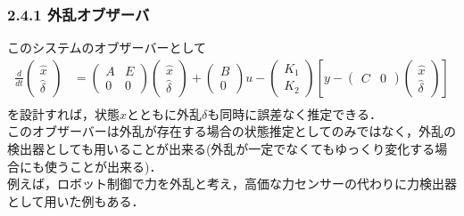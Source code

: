 \begin{frame}[t]
\frametitle{2.4.1 外乱オブザーバ}
このシステムのオブザーバーとして
\begin{align}
 \frac{d}{dt}
  \left(\begin{array}{c}
         \hat{x} \\
	 \hat{\delta}
	\end{array}\right)
  &=
  \left(\begin{array}{cc}
         A & E \\
	 0 & 0
	\end{array}\right)
  \left(\begin{array}{c}
         \hat{x} \\
	 \hat{\delta}
	\end{array}\right)
  +
  \left(\begin{array}{c}
         B \\
	 0
	\end{array}\right)
  u -
  \left(\begin{array}{c}
         K_1 \\
	 K_2
	\end{array}\right)
  \left[y -
   \left(\begin{array}{cc}
          C & 0
	 \end{array}\right)
   \left(\begin{array}{c}
	  \hat{x} \\
	  \hat{\delta}
	 \end{array}\right)\right] \nonumber \\
\end{align}
を設計すれば，状態$x$とともに外乱$\delta$も同時に誤差なく推定できる．
\\[3mm]

このオブザーバーは外乱が存在する場合の状態推定としてのみではなく，外乱の検出器としても用いることが出来る(外乱が一定でなくてもゆっくり変化する場合にも使うことが出来る)．
\\[3mm]

例えば，ロボット制御で力を外乱と考え，高価な力センサーの代わりに力検出器として用いた例もある．

\end{frame}

